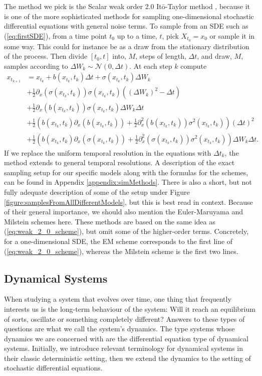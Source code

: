 The method we pick is the Scalar weak order 2.0 Itō-Taylor method \cite[Algorithm 8.5]{Srkk2019}, because it is one of the more sophisticated methods for sampling one-dimensional stochastic differential equations with general noise terms. To sample from an SDE such as (\ref{eq:firstSDE}), from a time point $t_0$ up to a time, $t$, pick $X_{t_0} = x_0$ or sample it in some way. This could for instance be as a draw from the stationary distribution of the process. Then divide $[t_0, t]$ into, $M$, steps of length, $\Delta t$, and draw, $M$, samples according to $\Delta W_k\sim\mathcal{N}\left(0, \Delta t\right)$. At each step $k$ compute
\begin{align}
    x_{t_{k + 1}} &= x_{t_{k}} + b(x_{t_{k}}, t_k)\Delta t + \sigma\left(x_{t_{k}}, t_k\right)\Delta W_k \nonumber \\
    &+ \frac{1}{2}\partial_x \left(\sigma\left(x_{t_{k}}, t_k\right)\right)\sigma\left(x_{t_{k}}, t_k\right)\left(\left(\Delta W_k\right)^2 - \Delta t\right) \nonumber \\
    &+ \frac{1}{2}\partial_x \left(b(x_{t_{k}}, t_k)\right)\sigma(x_{t_{k}}, t_k) \Delta W_k\Delta t \nonumber \\
    &+ \frac{1}{2}\left(b(x_{t_{k}}, t_k)\partial_x\left(b(x_{t_{k}}, t_k)\right) + \frac{1}{2}\partial_x^2\left(b\left(x_{t_k}, t_k\right)\right)\sigma^2(x_{t_k}, t_k)\right)\left(\Delta t\right)^2 \nonumber \\
    &+ \frac{1}{2}\left(b(x_{t_{k}}, t_k)\partial_x \left(\sigma(x_{t_{k}}, t_k)\right) + \frac{1}{2}\partial_x^2\left(\sigma(x_{t_k}, t_k)\right)\sigma^2(x_{t_k}, t_k)\right)\Delta W_k\Delta t. \label{eq:weak_2_0_scheme}
\end{align}
If we replace the uniform temporal resolution in the equations with $\Delta t_k$, the method extends to general temporal resolutions.
A description of the exact sampling setup for our specific models along with the formulas for the schemes, can be found in Appendix \ref{appendix:simMethods}. There is also a short, but not fully adequate description of some of the setup under Figure \ref{figure:samplesFromAllDifferentModels}, but this is best read in context. Because of their general importance, we should also mention the Euler-Maruyama and Milstein schemes here. These methods are based on the same idea as (\ref{eq:weak_2_0_scheme}), but omit some of the higher-order terms. Concretely, for a one-dimensional SDE, the EM scheme corresponds to the first line of (\ref{eq:weak_2_0_scheme}), whereas the Milstein scheme is the first two lines.
\subsection{Dynamical Systems}
When studying a system that evolves over time, one thing that frequently interests us is the long-term behaviour of the system: Will it reach an equilibrium of sorts, oscillate or something completely different? Answers to these types of questions are what we call the system's dynamics. The type systems whose dynamics we are concerned with are the differential equation type of dynamical systems. Initially, we introduce relevant terminology for dynamical systems in their classic deterministic setting, then we extend the dynamics to the setting of stochastic differential equations. 
